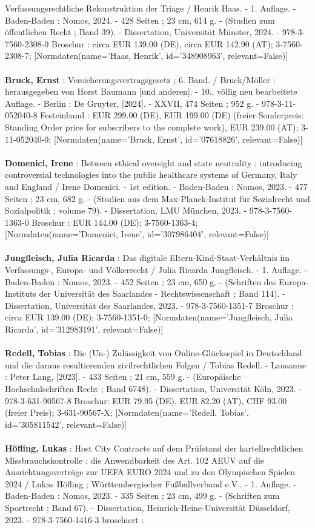\documentclass{article}
\begin{document}
\begin{multicols}{3}
Verfassungsrechtliche Rekonstruktion der Triage / Henrik Haas. - 1. Auflage. - Baden-Baden : Nomos, 2024. - 428 Seiten ; 23 cm, 614 g. - (Studien zum öffentlichen Recht ; Band 39). - Dissertation, Universität Münster, 2024. - 978-3-7560-2308-0 Broschur : circa EUR 139.00 (DE), circa EUR 142.90 (AT); 3-7560-2308-7; [Normdaten(name='Haas, Henrik', id='348908963', relevant=False)]\\\\\textbf{Bruck, Ernst} : Versicherungsvertragsgesetz ; 6. Band. / Bruck/Möller ; herausgegeben von Horst Baumann [und anderen]. - 10., völlig neu bearbeitete Auflage. - Berlin : De Gruyter, [2024]. - XXVII, 474 Seiten ; 952 g. - 978-3-11-052040-8 Festeinband : EUR 299.00 (DE), EUR 199.00 (DE) (freier Sonderpreis: Standing Order price for subscribers to the complete work), EUR 239.00 (AT); 3-11-052040-0; [Normdaten(name='Bruck, Ernst', id='07618826', relevant=False)]\\\\\textbf{Domenici, Irene} : Between ethical oversight and state neutrality : introducing controversial technologies into the public healthcare systems of Germany, Italy and England / Irene Domenici. - 1st edition. - Baden-Baden : Nomos, 2023. - 477 Seiten ; 23 cm, 682 g. - (Studien aus dem Max-Planck-Institut für Sozialrecht und Sozialpolitik ; volume 79). - Dissertation, LMU München, 2023. - 978-3-7560-1363-0 Broschur : EUR 144.00 (DE); 3-7560-1363-4; [Normdaten(name='Domenici, Irene', id='307986404', relevant=False)]\\\\\textbf{Jungfleisch, Julia Ricarda} : Das digitale Eltern-Kind-Staat-Verhältnis im Verfassungs-, Europa- und Völkerrecht / Julia Ricarda Jungfleisch. - 1. Auflage. - Baden-Baden : Nomos, 2023. - 452 Seiten ; 23 cm, 650 g. - (Schriften des Europa-Instituts der Universität des Saarlandes - Rechtswissenschaft ; Band 114). - Dissertation, Universität des Saarlandes, 2023. - 978-3-7560-1351-7 Broschur : circa EUR 139.00 (DE); 3-7560-1351-0; [Normdaten(name='Jungfleisch, Julia Ricarda', id='312983191', relevant=False)]\\\\\textbf{Redell, Tobias} : Die (Un-) Zulässigkeit von Online-Glücksspiel in Deutschland und die daraus resultierenden zivilrechtlichen Folgen / Tobias Redell. - Lausanne : Peter Lang, [2023]. - 433 Seiten ; 21 cm, 559 g. - (Europäische Hochschulschriften Recht ; Band 6748). - Dissertation, Universität Köln, 2023. - 978-3-631-90567-8 Broschur: EUR 79.95 (DE), EUR 82.20 (AT), CHF 93.00 (freier Preis); 3-631-90567-X; [Normdaten(name='Redell, Tobias', id='305811542', relevant=False)]\\\\\textbf{Höfling, Lukas} : Host City Contracts auf dem Prüfstand der kartellrechtlichen Missbrauchskontrolle : die Anwendbarkeit des Art. 102 AEUV auf die Ausrichtungsverträge zur UEFA EURO 2024 und zu den Olympischen Spielen 2024 / Lukas Höfling ; Württembergischer Fußballverband e.V.. - 1. Auflage. - Baden-Baden : Nomos, 2023. - 335 Seiten ; 23 cm, 499 g. - (Schriften zum Sportrecht ; Band 67). - Dissertation, Heinrich-Heine-Universität Düsseldorf, 2023. - 978-3-7560-1416-3 broschiert : 
\end{multicols}
\end{document}

